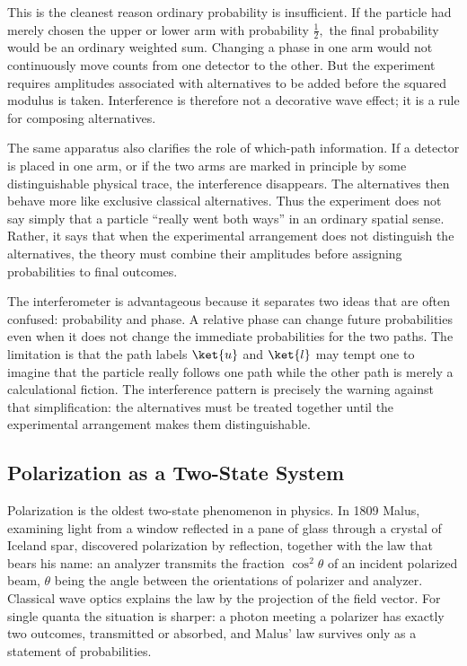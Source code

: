 This is the cleanest reason ordinary probability is insufficient. If the particle had merely chosen the upper or lower arm with probability $\frac12,$ the final probability would be an ordinary weighted sum. Changing a phase in one arm would not continuously move counts from one detector to the other. But the experiment requires amplitudes associated with alternatives to be added before the squared modulus is taken. Interference is therefore not a decorative wave effect; it is a rule for composing alternatives.

The same apparatus also clarifies the role of which-path information. If a detector is placed in one arm, or if the two arms are marked in principle by some distinguishable physical trace, the interference disappears. The alternatives then behave more like exclusive classical alternatives. Thus the experiment does not say simply that a particle ``really went both ways'' in an ordinary spatial sense. Rather, it says that when the experimental arrangement does not distinguish the alternatives, the theory must combine their amplitudes before assigning probabilities to final outcomes.

The interferometer is advantageous because it separates two ideas that are often confused: probability and phase. A relative phase can change future probabilities even when it does not change the immediate probabilities for the two paths. The limitation is that the path labels $\ket{u}$ and $\ket{l}$ may tempt one to imagine that the particle really follows one path while the other path is merely a calculational fiction. The interference pattern is precisely the warning against that simplification: the alternatives must be treated together until the experimental arrangement makes them distinguishable.

\subsection{Polarization as a Two-State System}
Polarization is the oldest two-state phenomenon in physics. In 1809 Malus, examining light from a window reflected in a pane of glass through a crystal of Iceland spar, discovered polarization by reflection, together with the law that bears his name: an analyzer transmits the fraction $\cos^2\theta$ of an incident polarized beam, $\theta$ being the angle between the orientations of polarizer and analyzer. Classical wave optics explains the law by the projection of the field vector. For single quanta the situation is sharper: a photon meeting a polarizer has exactly two outcomes, transmitted or absorbed, and Malus' law survives only as a statement of probabilities.

